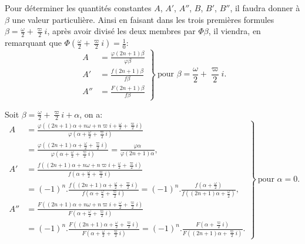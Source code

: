 \documentclass{article}
\begin{document}
Pour déterminer les quantités constantes $A$, $A'$, $A''$, $B$, $B'$, $B''$, il faudra donner à $\beta$ une valeur particulière. Ainsi en faisant dans les trois premières formules $\beta=\frac{\omega}{2}+\frac{\varpi}{2}i$, après avoir divisé les deux membres par $\Phi\beta$, il viendra, en remarquant que $\Phi\left(\frac{\omega}{2}+\frac{\varpi}{2}i\right)=\frac{1}{0}$:
\[ \left.\begin{aligned}
A&=\frac{\varphi(2n+1)\beta}{\varphi\beta}\\
A'&=\frac{f(2n+1)\beta}{f\beta}\\
A''&=\frac{F(2n+1)\beta}{f\beta}
\end{aligned}\right\}\ \text{pour }\beta=\frac{\omega}{2}+\frac{\varpi}{2}i. \]


Soit $\beta=\frac{\omega}{2}+\frac{\varpi}{2}i+\alpha$, on a:
\[ \left.\begin{aligned}
A&=\frac{\varphi\left((2n+1)\alpha+n\omega+n\varpi i+\frac{\omega}{2}+\frac{\varpi}{2}i\right)}{\varphi\left(\alpha+\frac{\omega}{2}+\frac{\varpi}{2}i\right)}\\
&=\frac{\varphi\left((2n+1)\alpha+\frac{\omega}{2}+\frac{\varpi}{2}i\right)}{\varphi\left(\alpha+\frac{\omega}{2}+\frac{\varpi}{2}i\right)}=\frac{\varphi\alpha}{\varphi(2n+1)\alpha},\\
A'&=\frac{f\left((2n+1)\alpha+n\omega+n\varpi i+\frac{\omega}{2}+\frac{\varpi}{2}i\right)}{f\left(\alpha+\frac{\omega}{2}+\frac{\varpi}{2}i\right)}\\
&=(-1)^{n}.\frac{f\left((2n+1)\alpha+\frac{\omega}{2}+\frac{\varpi}{2}i\right)}{f\left(\alpha+\frac{\omega}{2}+\frac{\varpi}{2}i\right)}=(-1)^{n}.\frac{f\left(\alpha+\frac{\omega}{2}\right)}{f\left((2n+1)\alpha+\frac{\omega}{2}\right)},\\
A''&=\frac{F\left((2n+1)\alpha+n\omega+n\varpi i+\frac{\omega}{2}+\frac{\varpi}{2}i\right)}{F\left(\alpha+\frac{\omega}{2}+\frac{\varpi}{2}i\right)}\\
&=(-1)^{n}.\frac{F\left((2n+1)\alpha+\frac{\omega}{2}+\frac{\varpi}{2}i\right)}{F\left(\alpha+\frac{\omega}{2}+\frac{\varpi}{2}i\right)}=(-1)^{n}.\frac{F\left(\alpha+\frac{\varpi}{2}i\right)}{F\left((2n+1)\alpha+\frac{\varpi}{2}i\right)}.
\end{aligned}\right\}\ \text{pour }\alpha=0. \]
\end{document}
